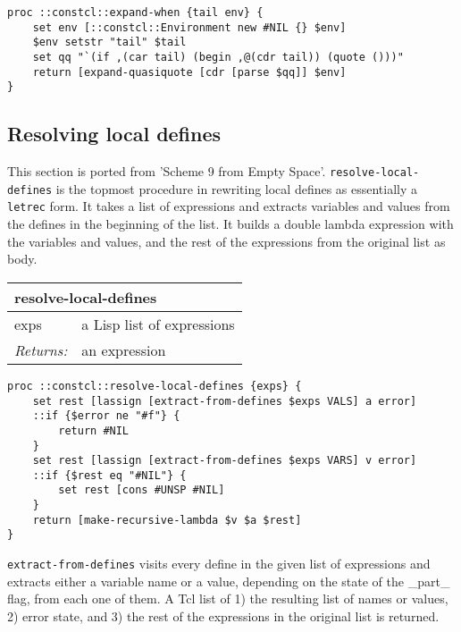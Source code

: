 \documentclass{report}
\begin{document}
\noindent\makebox[\linewidth]{\rule{\linewidth}{0.4pt}}
\begin{lstlisting}
proc ::constcl::expand-when {tail env} {
    set env [::constcl::Environment new #NIL {} $env]
    $env setstr "tail" $tail
    set qq "`(if ,(car tail) (begin ,@(cdr tail)) (quote ()))"
    return [expand-quasiquote [cdr [parse $qq]] $env]
}
\end{lstlisting}
\noindent\makebox[\linewidth]{\rule{\linewidth}{0.4pt}}
\subsection{Resolving local defines}
\label{resolving-local-defines}

This section is ported from 'Scheme 9 from Empty Space'. \texttt{resolve-local-defines} is the topmost procedure in rewriting local defines as essentially a \texttt{letrec} form. It takes a list of expressions and extracts variables and values from the defines in the beginning of the list. It builds a double lambda expression with the variables and values, and the rest of the expressions from the original list as body.

\begin{tabular}{ |l l| }
\hline
\multicolumn{2}{|l|}{resolve-local-defines} \\
\hline
exps & a Lisp list of expressions \\
\textit{Returns:} & an expression \\
\hline
\end{tabular}

\noindent\makebox[\linewidth]{\rule{\linewidth}{0.4pt}}
\begin{lstlisting}
proc ::constcl::resolve-local-defines {exps} {
    set rest [lassign [extract-from-defines $exps VALS] a error]
    ::if {$error ne "#f"} {
        return #NIL
    }
    set rest [lassign [extract-from-defines $exps VARS] v error]
    ::if {$rest eq "#NIL"} {
        set rest [cons #UNSP #NIL]
    }
    return [make-recursive-lambda $v $a $rest]
}
\end{lstlisting}
\noindent\makebox[\linewidth]{\rule{\linewidth}{0.4pt}}

\texttt{extract-from-defines} visits every define in the given list of expressions and extracts either a variable name or a value, depending on the state of the \_part\_ flag, from each one of them. A Tcl list of 1) the resulting list of names or values, 2) error state, and 3) the rest of the expressions in the original list is returned.
\end{document}
